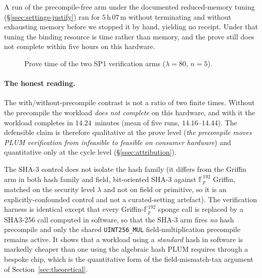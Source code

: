 A run of the precompile-free arm under the documented reduced-memory tuning (\S\ref{ssec:settings-justify}) ran for $5$\,h\,$07$\,m without terminating and without exhausting memory before we stopped it by hand, yielding no receipt. Under that tuning the binding resource is time rather than memory, and the prove still does not complete within five hours on this hardware.

\begin{figure}[H]
\centering
{}
\caption{Prove time of the two SP1 verification arms ($\lambda=80$, $n=5$).}
\label{fig:prove-time}
\end{figure}

\paragraph{The honest reading.}
The with/without-precompile contrast is not a ratio of two finite times. Without the precompile the workload \emph{does not complete} on this hardware, and with it the workload completes in $14.24$~minutes (mean of five runs, $14.16$--$14.44$). The defensible claim is therefore qualitative at the prove level (\emph{the precompile moves PLUM verification from infeasible to feasible on consumer hardware}) and quantitative only at the cycle level (\S\ref{ssec:attribution}).

The SHA-3 control does not isolate the hash family (it differs from the Griffin arm in both hash family and field, bit-oriented SHA-3 against $\mathbb{F}_p^{192}$ Griffin, matched on the security level $\lambda$ and not on field or primitive, so it is an explicitly-confounded control and not a curated-setting artefact). The verification harness is identical except that every Griffin-$\mathbb{F}_p^{192}$ sponge call is replaced by a SHA3-256 call computed in software, so that the SHA-3 arm fires \emph{no} hash precompile and only the shared \texttt{UINT256\_MUL} field-multiplication precompile remains active. It shows that a workload using a \emph{standard} hash in software is markedly cheaper than one using the algebraic hash PLUM requires through a bespoke chip, which is the quantitative form of the field-mismatch-tax argument of Section~\ref{sec:theoretical}.


